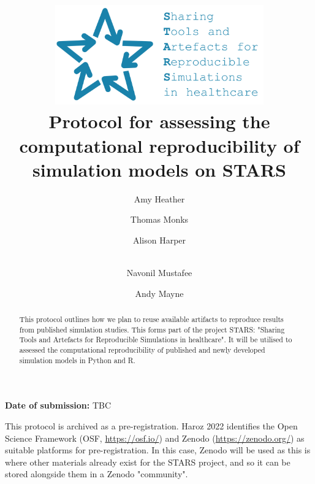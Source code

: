 \title{
    \vspace{-1cm}
    \includegraphics[width=9cm]{images/stars_logo_blue_text.png}\\[1cm]
    \textbf{Protocol for assessing the computational reproducibility of simulation models on STARS}
}

\author[1]{ Amy Heather}
\author[1]{ Thomas Monks}
\author[2]{ Alison Harper}
\author[2]{\\  Navonil Mustafee}
\author[3]{ Andy Mayne}


\date{}

\maketitle

\textbf{Date of submission:} TBC

\vspace{0.5cm}

\begin{shaded}
    \begin{abstract}
        This protocol outlines how we plan to reuse available artifacts to reproduce results from published simulation studies. This forms part of the project STARS: "Sharing Tools and Artefacts for Reproducible Simulations in healthcare". It will be utilised to assessed the computational reproducibility of published and newly developed simulation models in Python and R.
    \end{abstract}
\end{shaded}

\vspace{0.5cm}

This protocol is archived as a pre-registration. Haroz 2022 identifies the Open Science Framework (OSF, \url{https://osf.io/}) and Zenodo (\url{https://zenodo.org/}) as suitable platforms for pre-registration.\autocite{haroz_comparison_2022} In this case, Zenodo will be used as this is where other materials already exist for the STARS project, and so it can be stored alongside them in a Zenodo "community".

\newpage
\tableofcontents